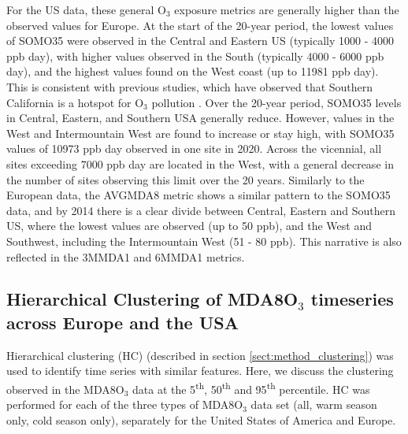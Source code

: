 \documentclass[journal abbreviation, manuscript]{copernicus}
\begin{document}
For the US data, these general O$_3$ exposure metrics are generally higher than the observed values for Europe. At the start of the 20-year period, the lowest values of SOMO35 were observed in the Central and Eastern US (typically 1000 - 4000 ppb day), with higher values observed in the South (typically 4000 - 6000 ppb day), and the highest values found on the West coast (up to 11981 ppb day). This is consistent with previous studies, which have observed that Southern California is a hotspot for O$_3$ pollution \citep{fleming_2018, WangKeding2024}. Over the 20-year period, SOMO35 levels in Central, Eastern, and Southern USA generally reduce. However, values in the West and Intermountain West are found to increase or stay high, with SOMO35 values of 10973 ppb day observed in one site in 2020. Across the vicennial, all sites exceeding 7000 ppb day are located in the West, with a general decrease in the number of sites observing this limit over the 20 years. Similarly to the European data, the AVGMDA8 metric shows a similar pattern to the SOMO35 data, and by 2014 there is a clear divide between Central, Eastern and Southern US, where the lowest values are observed (up to 50 ppb), and the West and Southwest, including the Intermountain West (51 - 80 ppb). This narrative is also reflected in the 3MMDA1 and 6MMDA1 metrics.


\subsection{Hierarchical Clustering of MDA8O$_3$ timeseries across Europe and the USA} \label{sect:cluster_stuff}
Hierarchical clustering (HC) (described in section \ref{sect:method_clustering}) was used to identify time series with similar features. Here, we discuss the clustering observed in the MDA8O$_3$ data at the 5\textsuperscript{th}, 50\textsuperscript{th} and 95\textsuperscript{th} percentile. HC was performed for each of the three types of MDA8O$_3$ data set (all, warm season only, cold season only), separately for the United States of America and Europe. 
\end{document}

